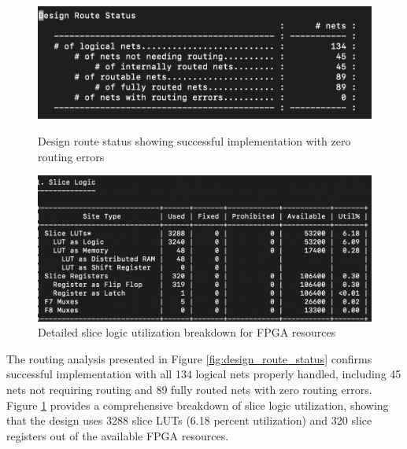 \begin{figure}[htbp]
    \centering
    \begin{minipage}{0.48\textwidth}
        \centering
        \includegraphics[width=\textwidth]{figures/design_route_status.png}
        \caption{Design route status showing successful implementation with zero routing errors}
        \label{fig:design_route_status}
    \end{minipage}
    \hfill
    \begin{minipage}{0.48\textwidth}
        \centering
        \includegraphics[width=\textwidth]{figures/slice_logic_utilization.png}
        \caption{Detailed slice logic utilization breakdown for FPGA resources}
        \label{fig:slice_logic_utilization}
    \end{minipage}
\end{figure}

The routing analysis presented in Figure \ref{fig:design_route_status} confirms successful implementation with all 134 logical nets properly handled, including 45 nets not requiring routing and 89 fully routed nets with zero routing errors. Figure \ref{fig:slice_logic_utilization} provides a comprehensive breakdown of slice logic utilization, showing that the design uses 3288 slice LUTs (6.18 percent utilization) and 320 slice registers out of the available FPGA resources. 